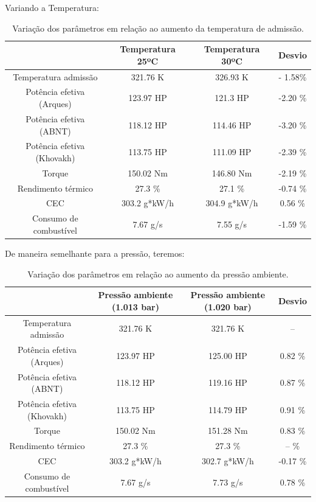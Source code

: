 \documentclass[a4paper]{article}
\begin{document}
Variando a Temperatura:

\begin{table}[H]
    \centering
    \begin{tabular}{|c|c|c|c|}
    \hline
    & Temperatura 25ºC & Temperatura 30ºC & Desvio\\
    \hline
    Temperatura admissão & 321.76 K & 326.93 K & - 1.58\%\\
    \hline
    Potência efetiva (Arques) & 123.97 HP & 121.3 HP & -2.20 \%\\
    \hline
    Potência efetiva (ABNT) & 118.12 HP & 114.46 HP & -3.20 \%\\
    \hline
    Potência efetiva (Khovakh) & 113.75 HP & 111.09 HP & -2.39 \%\\
    \hline
    Torque & 150.02 Nm & 146.80 Nm & -2.19 \%\\
    \hline
    Rendimento térmico & 27.3 \% & 27.1 \% & -0.74 \% \\
    \hline
    CEC & 303.2 g*kW/h & 304.9 g*kW/h & 0.56 \%\\
    \hline
    Consumo de combustível & 7.67 g/s & 7.55 g/s & -1.59 \%\\
    \hline
    \end{tabular}
    \caption{Variação dos parâmetros em relação ao aumento da temperatura de admissão.}
\end{table}
De maneira semelhante para a pressão, teremos:

\begin{table}[!htb]
    \centering
    \begin{tabular}{|c|c|c|c|}
    \hline
    & Pressão ambiente (1.013 bar) & Pressão ambiente (1.020 bar) & Desvio\\
    \hline
    Temperatura admissão & 321.76 K & 321.76 K & --\\
    \hline
    Potência efetiva (Arques) & 123.97 HP & 125.00 HP & 0.82 \%\\
    \hline
    Potência efetiva (ABNT) & 118.12 HP & 119.16 HP & 0.87 \%\\
    \hline
    Potência efetiva (Khovakh) & 113.75 HP & 114.79 HP & 0.91 \%\\
    \hline
    Torque & 150.02 Nm & 151.28 Nm & 0.83 \%\\
    \hline
    Rendimento térmico & 27.3 \% & 27.3 \% & -- \% \\
    \hline
    CEC & 303.2 g*kW/h & 302.7 g*kW/h & -0.17 \%\\
    \hline
    Consumo de combustível & 7.67 g/s & 7.73 g/s & 0.78 \%\\
    \hline
    \end{tabular}
    \caption{Variação dos parâmetros em relação ao aumento da pressão ambiente.}
\end{table}
\end{document}
